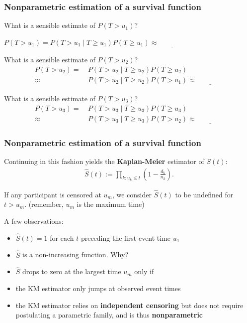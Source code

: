 \documentclass[12pt, 
hyperref={colorlinks=true, linkcolor=blue, urlcolor=cyan},dvipsnames]{beamer}
\begin{document}
\begin{frame}
\frametitle{Nonparametric estimation of a survival function}

What is a sensible estimate of $P(T > u_1)$?

$P(T > u_1) = P(T > u_1 \mid T \geq u_1)P(T \geq u_1) \approx \underline{\;\;\;\phantom{right}\;\;\;}$ \pause

What is a sensible estimate of $P(T > u_2)$?
\begin{align*}
P(T > u_2) =& \ P(T > u_2 \mid T \geq u_2)P(T \geq u_2) \\
\approx &\ P(T > u_2 \mid T \geq u_2)P(T > u_1) \approx \underline{\;\;\;\phantom{right}\;\;\;}
\end{align*} \pause

What is a sensible estimate of $P(T > u_3)$? \pause
\begin{align*}
P(T > u_3) =& \ P(T > u_3 \mid T \geq u_3)P(T \geq u_3) \\
\approx &\ P(T > u_3 \mid T \geq u_3)P(T > u_2) \approx \underline{\;\;\;\phantom{right}\;\;\;}
\end{align*}

\end{frame}

\begin{frame}
\frametitle{Nonparametric estimation of a survival function}
Continuing in this fashion yields the \textbf{Kaplan-Meier} estimator of $S(t)$: \vspace{-0.3cm}
\begin{align*}
\widehat{S}(t) := \prod_{k: u_k \leq t} \left(1 - \frac{d_k}{n_k} \right).
\end{align*}\vspace{-0.5cm}

If any participant is censored at $u_m$, we consider $\widehat{S}(t)$ to be undefined for $t > u_m$. (remember, $u_m$ is the maximum time)

A few observations:
\begin{itemize}
\item $\widehat{S}(t) = 1$ for each $t$ preceding the first event time $u_1$ \pause
\item $\widehat{S}$ is a non-increasing function. Why? \pause
\item $\widehat{S}$ drops to zero at the largest time $u_m$ only if \underline{\;\;\;\;\phantom{right}\;\;\;} \pause
\item the KM estimator only jumps at observed event times \pause
\item the KM estimator relies on \textbf{independent censoring} but does not require postulating a parametric family, and is thus \textbf{nonparametric}
\end{itemize}
\end{frame}
\end{document}
